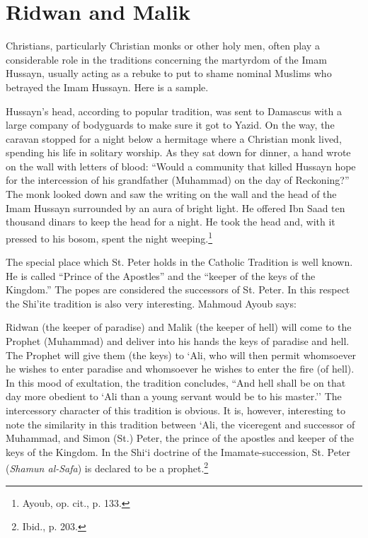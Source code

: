 \section{Ridwan and Malik}

Christians, particularly Christian monks or other holy men, often play a considerable role in the traditions concerning the martyrdom of the Imam Hussayn, usually acting as a rebuke to put to shame nominal Muslims who betrayed the Imam Hussayn. Here is a sample.

\begin{quotex}
Hussayn's head, according to popular tradition, was sent to Damascus with a large company of bodyguards to make sure it got to Yazid. On the way, the caravan stopped for a night below a hermitage where a Christian monk lived, spending his life in solitary worship. As they sat down for dinner, a hand wrote on the wall with letters of blood: ``Would a community that killed Hussayn hope for the intercession of his grandfather (Muhammad) on the day of Reckoning?'' The monk looked down and saw the writing on the wall and the head of the Imam Hussayn surrounded by an aura of bright light. He offered Ibn Saad ten thousand dinars to keep the head for a night. He took the head and, with it pressed to his bosom, spent the night weeping.\footnote{Ayoub, op. cit., p. 133.}
\end{quotex}


The special place which St. Peter holds in the Catholic Tradition is well known. He is called ``Prince of the Apostles'' and the ``keeper of the keys of the Kingdom.'' The popes are considered the successors of St. Peter. In this respect the Shi'ite tradition is also very interesting. Mahmoud Ayoub says:

\begin{quotex}
Ridwan (the keeper of paradise) and Malik (the keeper of hell) will come to the Prophet (Muhammad) and deliver into his hands the keys of paradise and hell. The Prophet will give them (the keys) to `Ali, who will then permit whomsoever he wishes to enter paradise and whomsoever he wishes to enter the fire (of hell). In this mood of exultation, the tradition concludes, ``And hell shall be on that day more obedient to `Ali than a young servant would be to his master.'' The intercessory character of this tradition is obvious. It is, however, interesting to note the similarity in this tradition between `Ali, the viceregent and successor of Muhammad, and Simon (St.) Peter, the prince of the apostles and keeper of the keys of the Kingdom. In the Shi`i doctrine of the Imamate-succession, St. Peter (\emph{Shamun al-Safa}) is declared to be a prophet.\footnote{Ibid., p. 203.}
\end{quotex}

